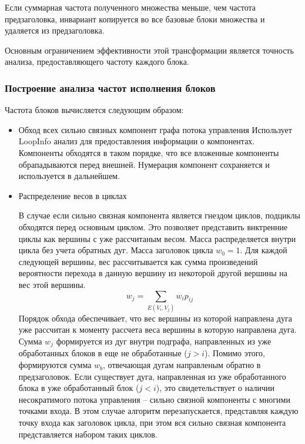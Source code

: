 Если суммарная частота полученного множества меньше, чем частота предзаголовка, инвариант копируется во все базовые блоки множества и удаляется из предзаголовка.

Основным ограничением эффективности этой трансформации является точность анализа, предоставляющего частоту каждого блока.

\subsubsection{Построение анализа частот исполнения блоков}

Частота блоков вычисляется следующим образом:
\begin{itemize}
    \item{Обход всех сильно связных компонент графа потока управления}
        Использует LoopInfo анализ для предоставления информации о компонентах.
        Компоненты обходятся в таком порядке, что все вложенные компоненты обрападываются перед внешней.
        Нумерация компонент сохраняется и используется в дальнейшем.

    \item{Распределение весов в циклах}

        В случае если сильно связная компонента является гнездом циклов, подциклы обходятся перед основным циклом.
        Это позволяет представить внктренние циклы как вершины с уже рассчитаным весом.
        Масса распределяется внутри цикла без учета обратных дуг.
        Масса заголовок цикла $w_0 = 1$. Для каждой следующей вершины, вес рассчитывается как сумма произведений вероятности перехода в данную вершину из некоторой другой вершины на вес этой вершины.
        $$ w_j = \sum_{E(V_i, V_j)} w_i p_{ij} $$
        Порядок обхода обеспечивает, что вес вершины из которой направлена дуга уже рассчитан к моменту рассчета веса вершины в которую направлена дуга.
        Сумма $ w_j $ формируется из дуг внутри подграфа, направленных из уже обработанных блоков в еще не обработанные ($j > i$).
        Помимо этого, формируются сумма $ w_b $, отвечающая дугам направленым обратно в предзаголовок.
        Если существует дуга, направленная из уже обработанного блока в уже обработанный блок ($ j < i $), это свидетельствует о наличии несократимого потока управления -- сильно связной компоненты с многими точками входа.
        В этом случае алгоритм перезапускается, представляя каждую точку входа как заголовок цикла, при этом вся сильно связная компонента представляется набором таких циклов.


\end{itemize}
